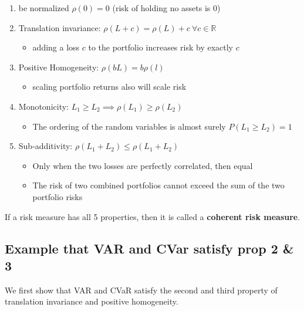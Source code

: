 \documentclass[
  oneside]{book}
\providecommand{\tightlist}{%
  \setlength{\itemsep}{0pt}\setlength{\parskip}{0pt}}
\begin{document}
\begin{enumerate}
\def\labelenumi{\arabic{enumi}.}
\tightlist
\item
  be normalized \(\rho(0)=0\) (risk of holding no assets is 0)
\item
  Translation invariance: \(\rho(L+c) = \rho(L) + c \ \forall c \in \mathbb{R}\)

  \begin{itemize}
  \tightlist
  \item
    adding a loss \(c\) to the portfolio increases risk by exactly \(c\)
  \end{itemize}
\item
  Positive Homogeneity: \(\rho(bL) = b\rho(l)\)

  \begin{itemize}
  \tightlist
  \item
    scaling portfolio returns also will scale risk
  \end{itemize}
\item
  Monotonicity: \(L_{1}\geq L_{2} \implies \rho(L_{1}) \geq \rho(L_{2})\)

  \begin{itemize}
  \tightlist
  \item
    The ordering of the random variables is almost surely \(P(L_{1}\geq L_{2})=1\)
  \end{itemize}
\item
  Sub-additivity: \(\rho(L_{1}+L_{2}) \leq \rho(L_{1}+L_{2})\)

  \begin{itemize}
  \tightlist
  \item
    Only when the two losses are perfectly correlated, then equal
  \item
    The risk of two combined portfolios cannot exceed the sum of the two portfolio risks
  \end{itemize}
\end{enumerate}

If a risk measure has all 5 properties, then it is called a \textbf{coherent risk measure}.

\hypertarget{example-that-var-and-cvar-satisfy-prop-2-3}{%
\subsection{Example that VAR and CVar satisfy prop 2 \& 3}\label{example-that-var-and-cvar-satisfy-prop-2-3}}

We first show that VAR and CVaR satisfy the second and third property of translation invariance and positive homogeneity.
\end{document}
